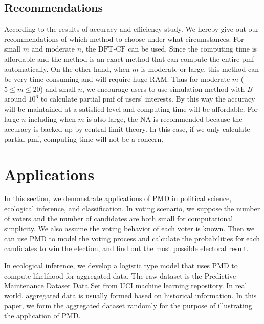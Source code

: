 \documentclass[12pt]{article}
\newcommand{\PMD}{\textrm{PMD}}
\newcommand{\NA}{{\textrm{NA}}}
\newcommand{\dft}{{\textrm{DFT-CF}}}
\begin{document}
\subsection{Recommendations}
According to the results of accuracy and efficiency study. We hereby give out our recommendations of which method to choose under what circumstances. For small $m$ and moderate $n$, the $\dft$ can be used. Since the computing time is affordable and the method is an exact method that can compute the entire pmf automatically. On the other hand, when $m$ is moderate or large, this method can be very time consuming and will require huge RAM. Thus for moderate $m$ ($5 \leq m \leq 20$) and small $n$, we encourage users to use simulation method with $B$ around $10^6$ to calculate partial pmf of users' interests. By this way the accuracy will be maintained at a satisfied level and computing time will be affordable. For large $n$ including when $m$ is also large, the $\NA$ is recommended because the accuracy is backed up by central limit theory. In this case, if we only calculate partial pmf, computing time will not be a concern.

\section{Applications}\label{sec:applications}

In this section, we demonstrate applications of $\PMD$ in political science, ecological inference, and classification. In voting scenario, we suppose the number of voters and the number of candidates are both small for computational simplicity. We also assume the voting behavior of each voter is known. Then we can use $\PMD$ to model the voting process and calculate the probabilities for each candidates to win the election, and find out the most possible electoral result.

In ecological inference, we develop a logistic type model that uses $\PMD$ to compute likelihood for aggregated data. The raw dataset is the Predictive Maintenance Dataset Data Set \cite{Dua:2019} from UCI machine learning repository. In real world, aggregated data is usually formed based on historical information. In this paper, we form the aggregated dataset randomly for the purpose of illustrating the application of $\PMD$.
\end{document}
